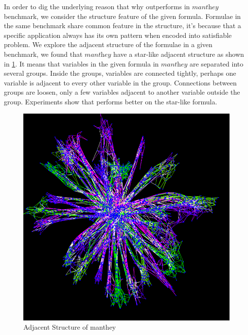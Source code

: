 In order to dig the underlying reason that why \tool outperforms \minibones in $\textit{manthey}$ benchmark, we consider the structure feature of the given formula. Formulae in the same benchmark share common feature in the structure, it's because that a specific application always has its own pattern when encoded into satisfiable problem. We explore the adjacent structure of the formulae in a given benchmark, we found that $\textit{manthey}$ have a star-like adjacent structure as shown in \ref{fig:star}. It means that variables in the given formula in $\textit{manthey}$ are separated into several groups. Inside the groups, variables are connected tightly, perhaps one variable is adjacent to every other variable in the group. Connections between groups are loosen, only a few variables adjacent to another variable outside the group. Experiments show that \tool performs better on the star-like formula.
\begin{figure}
\centering \includegraphics[scale=0.3]{star.png}
\caption{Adjacent Structure of manthey}\label{fig:star}
\end{figure}

